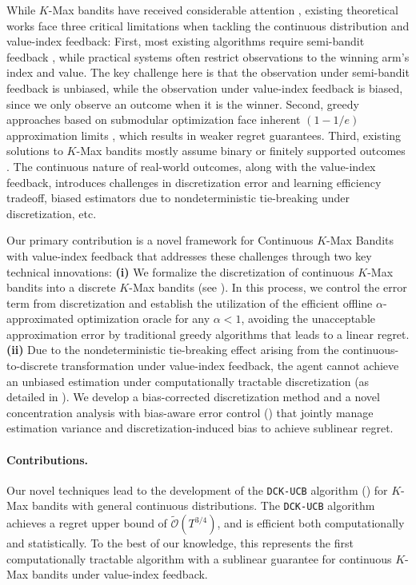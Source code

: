 While $K$-Max bandits have received considerable attention \citep{simchowitz2016best, chen2016combinatorial,agarwal2020choice}, existing theoretical works face three critical limitations when tackling the continuous distribution and value-index feedback:
First, most existing algorithms require semi-bandit feedback \citep{chen2016combinatorial,simchowitz2016best,wang2017improving}, while practical systems often restrict observations to the winning arm's index and value. 
%
The key challenge here is that the observation under semi-bandit feedback is unbiased, while the observation under value-index feedback is biased, since we only observe an outcome when it is the winner.
%
Second, greedy approaches based on submodular optimization \citep{streeter2008online,fourati2024combinatorial} face inherent $(1-1/e)$ approximation limits \citep{nemhauser1978analysis}, which results in weaker regret guarantees. Third, existing solutions to $K$-Max bandits mostly assume binary \citep{simchowitz2016best} or finitely supported outcomes \citep{wang2023combinatorial}. The continuous nature of real-world outcomes, along with the value-index feedback, introduces challenges in discretization error and learning efficiency tradeoff, biased estimators due to nondeterministic tie-breaking under discretization, etc. 

Our primary contribution is a novel framework for Continuous $K$-Max Bandits with value-index feedback that addresses these challenges through two key technical innovations: 
\textbf{(i)} We formalize the discretization of continuous $K$-Max bandits into a discrete $K$-Max bandits (see ). In this process, we control the error term from discretization and establish the utilization of the efficient offline $\alpha$-approximated optimization oracle for any $\alpha < 1$, avoiding the unacceptable approximation error by traditional greedy algorithms that leads to a linear regret.
\textbf{(ii)} Due to the nondeterministic tie-breaking effect arising from the continuous-to-discrete transformation under value-index feedback, the agent cannot achieve an unbiased estimation under computationally tractable discretization (as detailed in ). We develop a bias-corrected discretization method and a novel concentration analysis with bias-aware error control () that jointly manage estimation variance and discretization-induced bias to achieve sublinear regret.

\paragraph{Contributions.} 
Our novel techniques lead to the development of the \texttt{DCK-UCB} algorithm () for $K$-Max bandits with general continuous distributions. The \texttt{DCK-UCB} algorithm achieves a regret upper bound of $\widetilde{\mathcal{O}}(T^{3/4})$, and is efficient both computationally and statistically. To the best of our knowledge, this represents the first computationally tractable algorithm with a sublinear guarantee for continuous $K$-Max bandits under value-index feedback.


